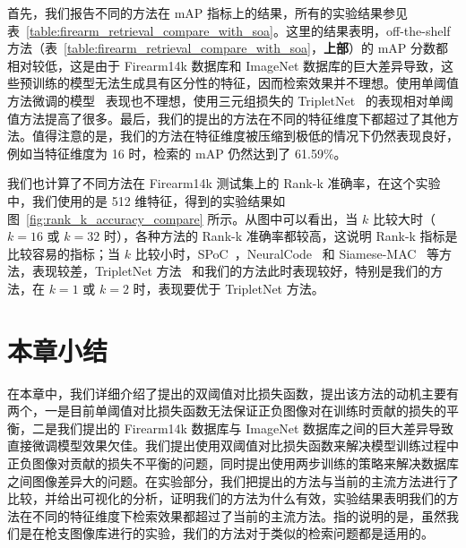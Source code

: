 首先，我们报告不同的方法在 mAP 指标上的结果，所有的实验结果参见表~\ref{table:firearm_retrieval_compare_with_soa}。这里的结果表明，off-the-shelf 方法（表~\ref{table:firearm_retrieval_compare_with_soa}，\textbf{上部}）的 mAP 分数都相对较低，这是由于 Firearm14k 数据库和 ImageNet 数据库的巨大差异导致，这些预训练的模型无法生成具有区分性的特征，因而检索效果并不理想。使用单阈值方法微调的模型~\cite{Radenovic2016CNNIR} 表现也不理想，使用三元组损失的 TripletNet~\cite{Gordo2016DeepIR} 的表现相对单阈值方法提高了很多。最后，我们的提出的方法在不同的特征维度下都超过了其他方法。值得注意的是，我们的方法在特征维度被压缩到极低的情况下仍然表现良好，例如当特征维度为 16 时，检索的 mAP 仍然达到了 61.59\%。

我们也计算了不同方法在 Firearm14k 测试集上的 Rank-k 准确率，在这个实验中，我们使用的是 512 维特征，得到的实验结果如图~\ref{fig:rank_k_accuracy_compare} 所示。从图中可以看出，当 $k$ 比较大时（$k=16$ 或 $k=32$ 时），各种方法的 Rank-k 准确率都较高，这说明 Rank-k 指标是比较容易的指标；当 $k$ 比较小时，SPoC~\cite{Babenko2015AggregatingLD}，NeuralCode~\cite{Babenko2014NeuralCF} 和 Siamese-MAC~\cite{Radenovic2016CNNIR} 等方法，表现较差，TripletNet 方法~\cite{Gordo2016DeepIR} 和我们的方法此时表现较好，特别是我们的方法，在 $k=1$ 或 $k=2$ 时，表现要优于 TripletNet 方法。

\section{本章小结}\label{sec:double_margin_conclusion}
在本章中，我们详细介绍了提出的双阈值对比损失函数，提出该方法的动机主要有两个，一是目前单阈值对比损失函数无法保证正负图像对在训练时贡献的损失的平衡，二是我们提出的 Firearm14k 数据库与 ImageNet 数据库之间的巨大差异导致直接微调模型效果欠佳。我们提出使用双阈值对比损失函数来解决模型训练过程中正负图像对贡献的损失不平衡的问题，同时提出使用两步训练的策略来解决数据库之间图像差异大的问题。在实验部分，我们把提出的方法与当前的主流方法进行了比较，并给出可视化的分析，证明我们的方法为什么有效，实验结果表明我们的方法在不同的特征维度下检索效果都超过了当前的主流方法。指的说明的是，虽然我们是在枪支图像库进行的实验，我们的方法对于类似的检索问题都是适用的。
